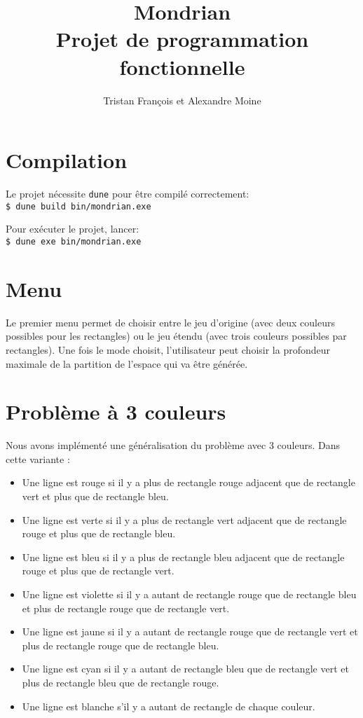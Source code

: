 \documentclass[10pt,a4paper]{article}
\begin{document}
	\title{Mondrian \\
			\large Projet de programmation fonctionnelle}
	
	\author{Tristan François et Alexandre Moine}
	\maketitle
	
\section{Compilation}
Le projet nécessite \verb|dune| pour être compilé correctement:\\
\verb|$ dune build bin/mondrian.exe|

Pour exécuter le projet, lancer:\\
\verb|$ dune exe bin/mondrian.exe|

\section{Menu}
Le premier menu permet de choisir entre le jeu d'origine (avec deux couleurs possibles pour les rectangles) ou le jeu étendu (avec trois couleurs possibles par rectangles).
Une fois le mode choisit, l'utilisateur peut choisir la profondeur maximale de la partition de l'espace qui va être générée.

\section{Problème à 3 couleurs}

Nous avons implémenté une généralisation du problème avec 3 couleurs. Dans cette variante :
\begin{itemize}
	\item Une ligne est rouge si il y a plus de rectangle rouge adjacent que de rectangle vert et plus que de rectangle bleu.
	\item Une ligne est verte si il y a plus de rectangle vert adjacent que de rectangle rouge et plus que de rectangle bleu.
	\item Une ligne est bleu si il y a plus de rectangle bleu adjacent que de rectangle rouge et plus que de rectangle vert.
	\item Une ligne est violette si il y a autant de rectangle rouge que de rectangle bleu et plus de rectangle rouge que de rectangle vert.
	\item Une ligne est jaune si il y a autant de rectangle rouge que de rectangle vert et plus de rectangle rouge que de rectangle bleu.
	\item Une ligne est cyan si il y a autant de rectangle bleu que de rectangle vert et plus de rectangle bleu que de rectangle rouge.
	\item Une ligne est blanche s'il y a autant de rectangle de chaque couleur.
\end{itemize}
	
\end{document}
